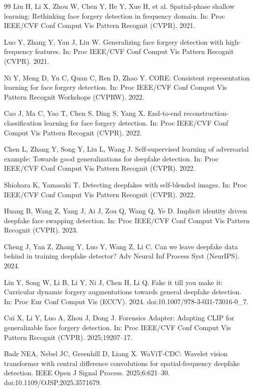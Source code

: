 \documentclass[fonts]{icst}
\begin{document}
\begin{thebibliography}{99}
Liu H, Li X, Zhou W, Chen Y, He Y, Xue H, et al.
Spatial-phase shallow learning: Rethinking face forgery detection in frequency domain.
In: Proc IEEE/CVF Conf Comput Vis Pattern Recognit (CVPR). 2021.

Luo Y, Zhang Y, Yan J, Liu W.
Generalizing face forgery detection with high-frequency features.
In: Proc IEEE/CVF Conf Comput Vis Pattern Recognit (CVPR). 2021.

Ni Y, Meng D, Yu C, Quan C, Ren D, Zhao Y.
CORE: Consistent representation learning for face forgery detection.
In: Proc IEEE/CVF Conf Comput Vis Pattern Recognit Workshops (CVPRW). 2022.

Cao J, Ma C, Yao T, Chen S, Ding S, Yang X.
End-to-end reconstruction-classification learning for face forgery detection.
In: Proc IEEE/CVF Conf Comput Vis Pattern Recognit (CVPR). 2022.

Chen L, Zhang Y, Song Y, Liu L, Wang J.
Self-supervised learning of adversarial example: Towards good generalizations for deepfake detection.
In: Proc IEEE/CVF Conf Comput Vis Pattern Recognit (CVPR). 2022.

Shiohara K, Yamasaki T.
Detecting deepfakes with self-blended images.
In: Proc IEEE/CVF Conf Comput Vis Pattern Recognit (CVPR). 2022.

Huang B, Wang Z, Yang J, Ai J, Zou Q, Wang Q, Ye D.
Implicit identity driven deepfake face swapping detection.
In: Proc IEEE/CVF Conf Comput Vis Pattern Recognit (CVPR). 2023.

Cheng J, Yan Z, Zhang Y, Luo Y, Wang Z, Li C.
Can we leave deepfake data behind in training deepfake detector?
Adv Neural Inf Process Syst (NeurIPS). 2024.

Lin Y, Song W, Li B, Li Y, Ni J, Chen H, Li Q.
Fake it till you make it: Curricular dynamic forgery augmentations towards general deepfake detection.
In: Proc Eur Conf Comput Vis (ECCV). 2024. doi:10.1007/978-3-031-73016-0\_7.

Cui X, Li Y, Luo A, Zhou J, Dong J.
Forensics Adapter: Adapting CLIP for generalizable face forgery detection.
In: Proc IEEE/CVF Conf Comput Vis Pattern Recognit (CVPR). 2025;19207--17.

Badr NEA, Nebel JC, Greenhill D, Liang X.
WaViT-CDC: Wavelet vision transformer with central difference convolutions for spatial-frequency deepfake detection.
IEEE Open J Signal Process. 2025;6:621--30. doi:10.1109/OJSP.2025.3571679.


\end{thebibliography}
\end{document}
